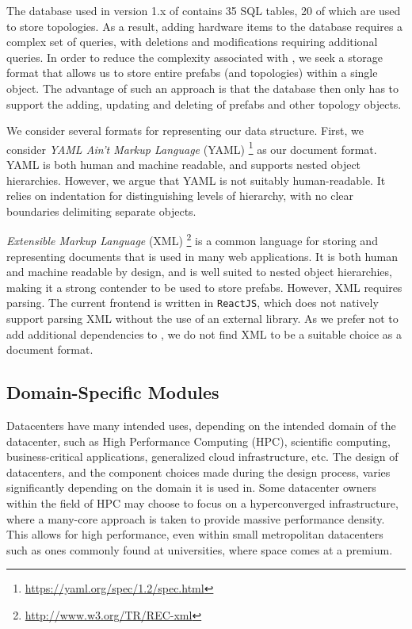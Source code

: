 \documentclass[11pt]{article}
\begin{document}
		The database used in version 1.x of \opendc{} contains 35 SQL tables, 20 of which are used to store topologies.
		As a result, adding hardware items to the database requires a complex set of queries, with deletions and modifications requiring additional queries.
		In order to reduce the complexity associated with \opendc{}, we seek a storage format that allows us to store entire prefabs (and topologies) within a single object.
		The advantage of such an approach is that the database then only has to support the adding, updating and deleting of prefabs and other topology objects.

		We consider several formats for representing our data structure.
		First, we consider \textit{YAML Ain't Markup Language} (YAML) \footnote{\url{https://yaml.org/spec/1.2/spec.html}} as our document format.
		YAML is both human and machine readable, and supports nested object hierarchies.
		However, we argue that YAML is not suitably human-readable.
		It relies on indentation for distinguishing levels of hierarchy, with no clear boundaries delimiting separate objects.

		\textit{Extensible Markup Language} (XML) \footnote{\url{http://www.w3.org/TR/REC-xml}} is a common language for storing and representing documents that is used in many web applications.
		It is both human and machine readable by design, and is well suited to nested object hierarchies, making it a strong contender to be used to store prefabs.
		However, XML requires parsing.
		The current \opendc{} frontend is written in \verb|ReactJS|, which does not natively support parsing XML without the use of an external library.
		As we prefer not to add additional dependencies to \opendc{}, we do not find XML to be a suitable choice as a document format.
	
	\subsection{Domain-Specific Modules}
		Datacenters have many intended uses, depending on the intended domain of the datacenter, such as High Performance Computing (HPC), scientific computing, business-critical applications, generalized cloud infrastructure, etc.
		The design of datacenters, and the component choices made during the design process, varies significantly depending on the domain it is used in.
		Some datacenter owners within the field of HPC may choose to focus on a hyperconverged infrastructure, where a many-core approach is taken to provide massive performance density.
		This allows for high performance, even within small metropolitan datacenters such as ones commonly found at universities, where space comes at a premium.
\end{document}
